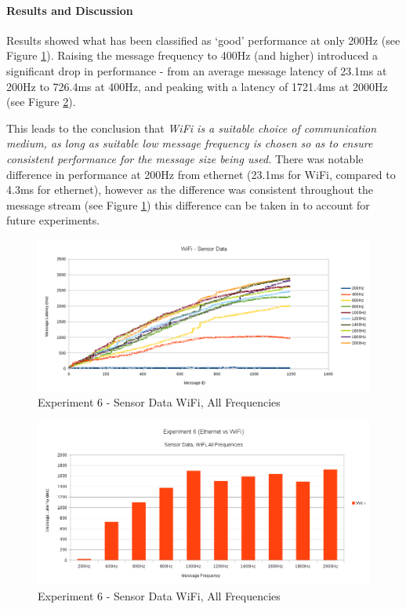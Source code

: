 \documentclass[../dissertation.tex]{subfiles}
\begin{document}
\paragraph{Results and Discussion} Results showed what has been classified as `good' performance at only 200Hz (see Figure \ref{exp6-sensor-wifi-all-freq-stream}). Raising the message frequency to 400Hz (and higher) introduced a significant drop in performance - from an average message latency of 23.1ms at 200Hz to 726.4ms at 400Hz, and peaking with a latency of 1721.4ms at 2000Hz (see Figure \ref{exp6-sensor-wifi-all-freq-mean}).

This leads to the conclusion that \textit{WiFi is a suitable choice of communication medium, as long as suitable low message frequency is chosen so as to ensure consistent performance for the message size being used.} There was notable difference in performance at 200Hz from ethernet (23.1ms for WiFi, compared to 4.3ms for ethernet), however as the difference was consistent throughout the message stream (see Figure \ref{exp6-sensor-wifi-all-freq-stream}) this difference can be taken in to account for future experiments.

\begin{figure}[H]
\centering
\includegraphics[width=\textwidth]{images/experiment6/sensor_data_wifi_all_freqs_stream.png}
\caption{Experiment 6 - Sensor Data WiFi, All Frequencies}
\label{exp6-sensor-wifi-all-freq-stream}
\end{figure}

\begin{figure}[H]
\centering
\includegraphics[width=\textwidth]{images/experiment6/sensor_data_wifi_all_freqs_mean.png}
\caption{Experiment 6 - Sensor Data WiFi, All Frequencies}
\label{exp6-sensor-wifi-all-freq-mean}
\end{figure}
\end{document}
